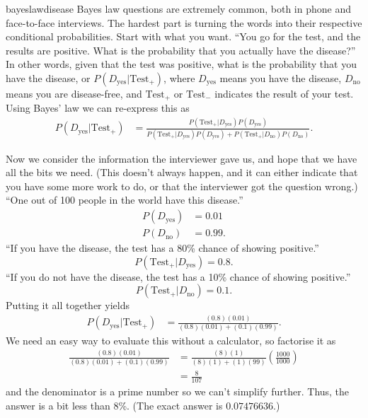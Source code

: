 \begin{answer}{bayeslawdisease}
Bayes law questions are extremely common, both in phone and face-to-face interviews.
The hardest part is turning the words into their respective conditional probabilities.
Start with what you want.
``You go for the test, and the results are positive.
What is the probability that you actually have the disease?''
In other words, given that the test was positive, what is the probability that you have the disease, or $P(D_\text{yes}|\text{Test}_+)$, where
$D_\text{yes}$ means you have the disease,
$D_\text{no}$ means you are disease-free,
and
$\text{Test}_+$ or
$\text{Test}_-$ indicates the result of your test.
Using Bayes' law we can re-express this as
\begin{align*}
P(D_\text{yes}|\text{Test}_+)
&=
\frac{
  P(
    \text{Test}_+
  |
    D_\text{yes}
  )
  P(
    D_\text{yes}
   )
}
{
  P(
    \text{Test}_+
  |
    D_\text{yes}
  )
  P(
    D_\text{yes}
   )
   +
  P(
    \text{Test}_+
  |
    D_\text{no}
  )
  P(
    D_\text{no}
   )
}
\text{.}
\end{align*}

Now we consider the information the interviewer gave us, and hope that we have all the bits we need. (This doesn't always happen, and it can either indicate that you have some more work to do, or that the interviewer got the question wrong.)
``One out of 100 people in the world have this disease.''
\begin{align*}
  P( D_\text{yes} ) & = 0.01 \\
  P( D_\text{no} ) & = 0.99
  \text{.}
\end{align*}
``If you have the disease, the test has a 80\% chance of showing positive.''
\[
  P( \text{Test}_+ | D_\text{yes} ) = 0.8
  \text{.}
\]
``If you do not have the disease, the test has a 10\% chance of showing positive.''
\[
  P( \text{Test}_+ | D_\text{no} ) = 0.1
  \text{.}
\]
Putting it all together yields
\begin{align*}
P(D_\text{yes}|\text{Test}_+)
&= \frac{ (0.8)(0.01) }{ (0.8)(0.01) + (0.1)(0.99)  }
\text{.}
\end{align*}
We need an easy way to evaluate this without a calculator, so factorise it as
\begin{align*}
\frac{ (0.8)(0.01) }{ (0.8)(0.01) + (0.1)(0.99)  }
&= \frac{ (8)(1) }{ (8)(1) + (1)(99)  } \left( \frac{1000}{1000}  \right) \\
&= \frac{8}{107}
\end{align*}
and the denominator is a prime number so we can't simplify further.
Thus, the answer is a bit less than 8\%.
(The exact answer is $0.07476636$.)


\end{answer}

